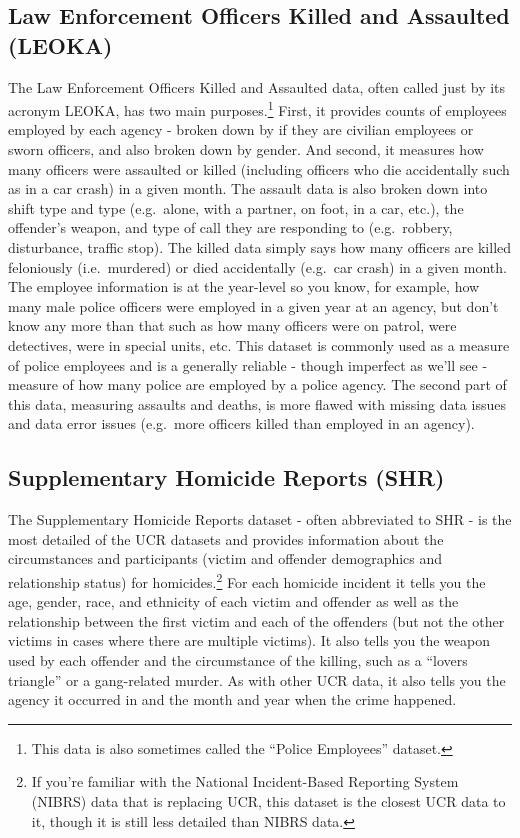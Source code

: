 \documentclass[
  12pt,
  openany]{book}
\begin{document}
\hypertarget{law-enforcement-officers-killed-and-assaulted-leoka}{%
\subsection{Law Enforcement Officers Killed and Assaulted (LEOKA)}\label{law-enforcement-officers-killed-and-assaulted-leoka}}

The Law Enforcement Officers Killed and Assaulted data, often called just by its acronym LEOKA, has two main purposes.\footnote{This data is also sometimes called the ``Police Employees'' dataset.} First, it provides counts of employees employed by each agency - broken down by if they are civilian employees or sworn officers, and also broken down by gender. And second, it measures how many officers were assaulted or killed (including officers who die accidentally such as in a car crash) in a given month. The assault data is also broken down into shift type and type (e.g.~alone, with a partner, on foot, in a car, etc.), the offender's weapon, and type of call they are responding to (e.g.~robbery, disturbance, traffic stop). The killed data simply says how many officers are killed feloniously (i.e.~murdered) or died accidentally (e.g.~car crash) in a given month. The employee information is at the year-level so you know, for example, how many male police officers were employed in a given year at an agency, but don't know any more than that such as how many officers were on patrol, were detectives, were in special units, etc. This dataset is commonly used as a measure of police employees and is a generally reliable - though imperfect as we'll see - measure of how many police are employed by a police agency. The second part of this data, measuring assaults and deaths, is more flawed with missing data issues and data error issues (e.g.~more officers killed than employed in an agency).

\hypertarget{supplementary-homicide-reports-shr}{%
\subsection{Supplementary Homicide Reports (SHR)}\label{supplementary-homicide-reports-shr}}

The Supplementary Homicide Reports dataset - often abbreviated to SHR - is the most detailed of the UCR datasets and provides information about the circumstances and participants (victim and offender demographics and relationship status) for homicides.\footnote{If you're familiar with the National Incident-Based Reporting System (NIBRS) data that is replacing UCR, this dataset is the closest UCR data to it, though it is still less detailed than NIBRS data.} For each homicide incident it tells you the age, gender, race, and ethnicity of each victim and offender as well as the relationship between the first victim and each of the offenders (but not the other victims in cases where there are multiple victims). It also tells you the weapon used by each offender and the circumstance of the killing, such as a ``lovers triangle'' or a gang-related murder. As with other UCR data, it also tells you the agency it occurred in and the month and year when the crime happened.
\end{document}
